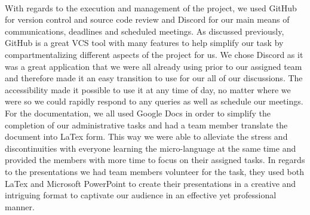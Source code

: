         \paragraph{}
        With regards to the execution and management of the project, we used GitHub for version control and source code review and Discord for our main means of communications, deadlines and scheduled meetings. As discussed previously, GitHub is a great VCS tool with many features to help simplify our task by compartmentalizing different aspects of the project for us. We chose Discord as it was a great application that we were all already using prior to our assigned team and therefore made it an easy transition to use for our all of our discussions. The accessibility made it possible to use it at any time of day, no matter where we were so we could rapidly respond to any queries as well as schedule our meetings. For the documentation, we all used Google Docs in order to simplify the completion of our administrative tasks and had a team member translate the document into LaTex form. This way we were able to alleviate the stress and discontinuities with everyone learning the micro-language at the same time and provided the members with more time to focus on their assigned tasks. In regards to the presentations we had team members volunteer for the task, they used both LaTex and Microsoft PowerPoint to create their presentations in a creative and intriguing format to captivate our audience in an effective yet professional manner.
